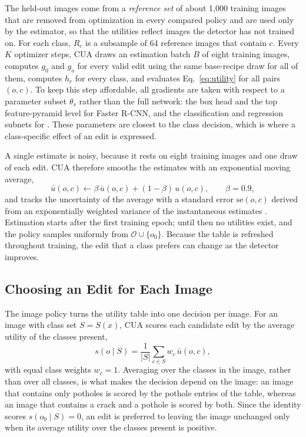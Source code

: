 The held-out images come from a \emph{reference set} of about 1,000 training images that are removed from optimization in every compared policy and are used only by the estimator, so that the utilities reflect images the detector has not trained on. For each class, $R_c$ is a subsample of 64 reference images that contain $c$. Every $K$ optimizer steps, CUA draws an estimation batch $B$ of eight training images, computes $g_0$ and $g_o$ for every valid edit using the same base-recipe draw for all of them, computes $h_c$ for every class, and evaluates Eq.~\eqref{eq:utility} for all pairs $(o,c)$. To keep this step affordable, all gradients are taken with respect to a parameter subset $\theta_s$ rather than the full network: the box head and the top feature-pyramid level for Faster R-CNN, and the classification and regression subnets for . These parameters are closest to the class decision, which is where a class-specific effect of an edit is expressed.

A single estimate is noisy, because it rests on eight training images and one draw of each edit. CUA therefore smooths the estimates with an exponential moving average,
\begin{equation}
\bar u(o,c)\leftarrow\beta\,\bar u(o,c)+(1-\beta)\,u(o,c),\qquad\beta=0.9,
\label{eq:ema}
\end{equation}
and tracks the uncertainty of the average with a standard error $\mathrm{se}(o,c)$ derived from an exponentially weighted variance of the instantaneous estimates . Estimation starts after the first training epoch; until then no utilities exist, and the policy samples uniformly from $\mathcal{O}\cup\{o_0\}$. Because the table is refreshed throughout training, the edit that a class prefers can change as the detector improves.

\subsection{Choosing an Edit for Each Image}
\label{sec:method_policy}

The image policy turns the utility table into one decision per image. For an image with class set $S=S(x)$, CUA scores each candidate edit by the average utility of the classes present,
\begin{equation}
s(o\mid S)=\frac{1}{|S|}\sum_{c\in S}w_c\,\bar u(o,c),
\label{eq:score}
\end{equation}
with equal class weights $w_c=1$. Averaging over the classes in the image, rather than over all classes, is what makes the decision depend on the image: an image that contains only potholes is scored by the pothole entries of the table, whereas an image that contains a crack and a pothole is scored by both. Since the identity scores $s(o_0\mid S)=0$, an edit is preferred to leaving the image unchanged only when its average utility over the classes present is positive.

